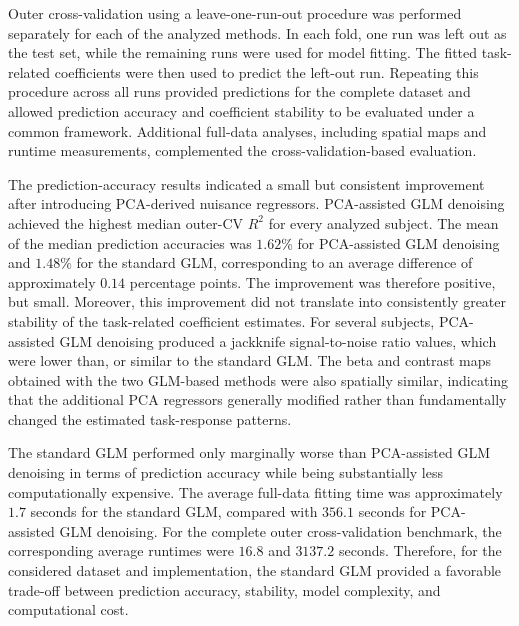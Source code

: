 \documentclass[english]{pwr_wmat_praca_dyplomowa}
\theoremstyle{definition}
\theoremstyle{remark}
\begin{document}
Outer cross-validation using a leave-one-run-out procedure was performed separately for each of the analyzed methods. In each fold, one run was left out as the test set, while the remaining runs were used for model fitting. The fitted task-related coefficients were then used to predict the left-out run. Repeating this procedure across all runs provided predictions for the complete dataset and allowed prediction accuracy and coefficient stability to be evaluated under a common framework. Additional full-data analyses, including spatial maps and runtime measurements, complemented the cross-validation-based evaluation.

The prediction-accuracy results indicated a small but consistent improvement after introducing PCA-derived nuisance regressors. PCA-assisted GLM denoising achieved the highest median outer-CV $R^2$ for every analyzed subject. The mean of the median prediction accuracies was $1.62\%$ for PCA-assisted GLM denoising and $1.48\%$ for the standard GLM, corresponding to an average difference of approximately $0.14$ percentage points. The improvement was therefore positive, but small. Moreover, this improvement did not translate into consistently greater stability of the task-related coefficient estimates. For several subjects, PCA-assisted GLM denoising produced a jackknife signal-to-noise ratio values, which were lower than, or similar to the standard GLM. The beta and contrast maps obtained with the two GLM-based methods were also spatially similar, indicating that the additional PCA regressors generally modified rather than fundamentally changed the estimated task-response patterns.

The standard GLM performed only marginally worse than PCA-assisted GLM denoising in terms of prediction accuracy while being substantially less computationally expensive. The average full-data fitting time was approximately $1.7$ seconds for the standard GLM, compared with $356.1$ seconds for PCA-assisted GLM denoising. For the complete outer cross-validation benchmark, the corresponding average runtimes were $16.8$ and $3137.2$ seconds. Therefore, for the considered dataset and implementation, the standard GLM provided a favorable trade-off between prediction accuracy, stability, model complexity, and computational cost.
\end{document}
